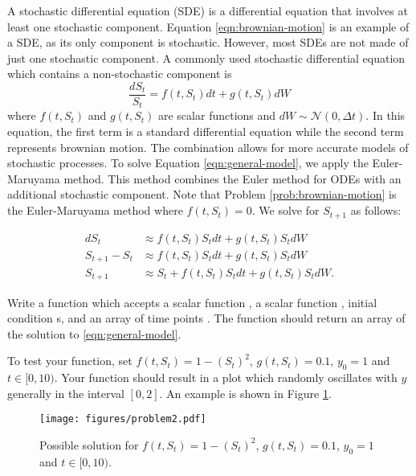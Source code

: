 A stochastic differential equation (SDE) is a differential equation that involves at least one stochastic component.
Equation \ref{eqn:brownian-motion} is an example of a SDE, as its only component is stochastic.
However, most SDEs are not made of just one stochastic component.
A commonly used stochastic differential equation which contains a non-stochastic component is
\begin{equation}
\frac{dS_t}{S_t}=f(t,S_t)dt + g(t,S_t)dW
\label{eqn:general-model}
\end{equation}
where $f(t,S_t)$ and $g(t,S_t)$ are scalar functions and $dW\sim\mathscr{N}(0,\Delta t)$.
In this equation, the first term is a standard differential equation while the second term represents brownian motion.
The combination allows for more accurate models of stochastic processes.
To solve Equation \ref{eqn:general-model}, we apply the Euler-Maruyama method.
This method combines the Euler method for ODEs with an additional stochastic component.
Note that Problem \ref{prob:brownian-motion} is the Euler-Maruyama method where $f(t,S_t)=0$.
We solve for $S_{t+1}$ as follows:

\begin{align*}
dS_t&\approx f(t,S_t)S_tdt + g(t,S_t)S_tdW\\
S_{t+1}-S_t&\approx f(t,S_t)S_tdt + g(t,S_t)S_tdW\\
S_{t+1}&\approx S_t+f(t,S_t)S_tdt + g(t,S_t)S_tdW.
\end{align*}

\begin{problem}
Write a function  which accepts a scalar function , a scalar function , initial condition s, and an array of time points .
The function should return an array of the solution to \ref{eqn:general-model}.

To test your function, set $f(t,S_t)=1-(S_t)^2$, $g(t,S_t)=0.1$, $y_0=1$ and $t\in[0,10)$.
Your function should result in a plot which randomly oscillates with $y$ generally in the interval $[0,2]$.
An example is shown in Figure \ref{fig:sde:prob2}.
\label{prob:euler-maruyama}
\end{problem}

\begin{figure}
\texttt{[image: figures/problem2.pdf]}
\caption{Possible solution for $f(t,S_t)=1-(S_t)^2$, $g(t,S_t)=0.1$, $y_0=1$ and $t\in[0,10)$.}
\label{fig:sde:prob2}
\end{figure}

